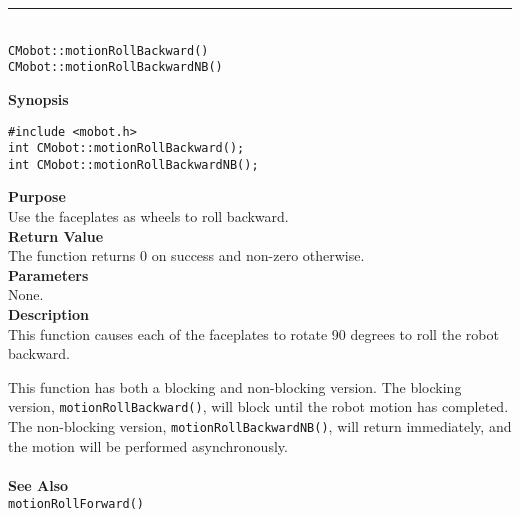 \noindent
\vspace{5pt}
\rule{4.5in}{0.015in}\\
\noindent
{\LARGE \texttt{CMobot::motionRollBackward()}}\\
{\LARGE \texttt{CMobot::motionRollBackwardNB()}}\\
{}

\noindent
{\bf Synopsis}
\vspace{-8pt}
\begin{verbatim}
#include <mobot.h>
int CMobot::motionRollBackward();
int CMobot::motionRollBackwardNB();
\end{verbatim}

\noindent
{\bf Purpose}\\
Use the faceplates as wheels to roll backward.\\

\noindent
{\bf Return Value}\\
The function returns 0 on success and non-zero otherwise.\\

\noindent
{\bf Parameters}\\
None.\\

\noindent
{\bf Description}\\
This function causes each of the faceplates to rotate 90 degrees to roll the
robot backward.

This function has both a blocking and non-blocking version.
The blocking version, \texttt{motionRollBackward()}, will block until the
robot motion has completed. The non-blocking version, \texttt{motionRollBackwardNB()},
will return immediately, and the motion will be performed asynchronously.\\
\\

\noindent
{\bf See Also}\\
\texttt{motionRollForward()}

